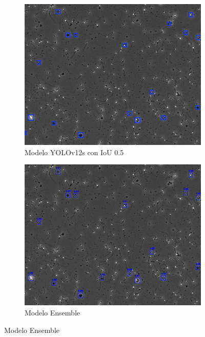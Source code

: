 \documentclass[12pt,a4paper,onecolumn,oneside]{report}
\begin{document}
\begin{figure}[H]
  \vspace{0.3cm} 
  
  \begin{subfigure}[b]{0.48\textwidth}
    \centering
    \includegraphics[width=\textwidth]{figuras/evaluacion_cualitativa/38/38_v12.jpg}
    \caption{Modelo YOLOv12s con IoU 0.5}
    \label{fig:yolov12s_IoU0.5_image_38}
  \end{subfigure}
  \hfill
  \begin{subfigure}[b]{0.48\textwidth}
    \centering
    \includegraphics[width=\textwidth]{figuras/evaluacion_cualitativa/38/38_ensemble.jpg}
    \caption{Modelo Ensemble}
    \label{fig:ensemble_image_38}
  \end{subfigure}


\end{figure}
\end{document}
